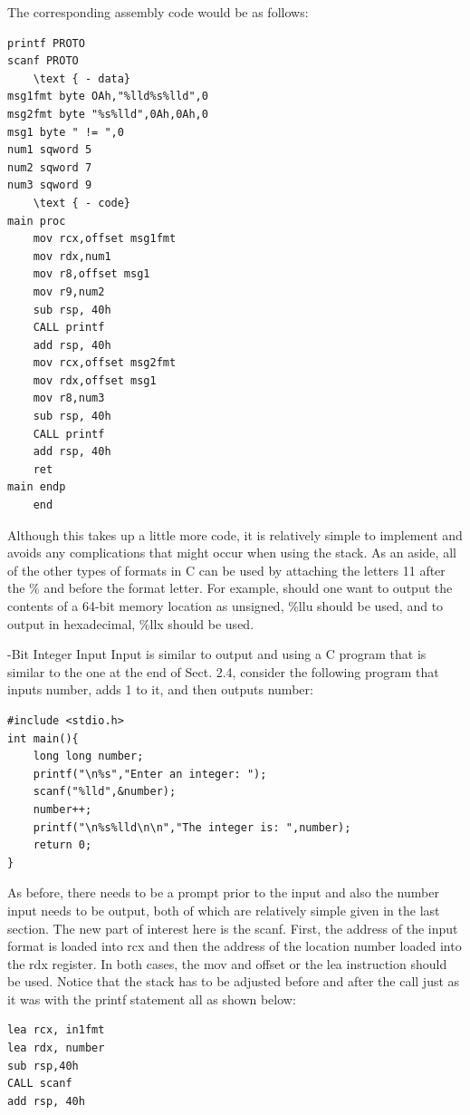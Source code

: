 \documentclass[10pt]{book}
\begin{document}
The corresponding assembly code would be as follows:

\begin{verbatim}
printf PROTO
scanf PROTO
    \text { - data}
msg1fmt byte OAh,"%lld%s%lld",0
msg2fmt byte "%s%lld",0Ah,0Ah,0
msg1 byte " != ",0
num1 sqword 5
num2 sqword 7
num3 sqword 9
    \text { - code}
main proc
    mov rcx,offset msg1fmt
    mov rdx,num1
    mov r8,offset msg1
    mov r9,num2
    sub rsp, 40h
    CALL printf
    add rsp, 40h
    mov rcx,offset msg2fmt
    mov rdx,offset msg1
    mov r8,num3
    sub rsp, 40h
    CALL printf
    add rsp, 40h
    ret
main endp
    end
\end{verbatim}

Although this takes up a little more code, it is relatively simple to implement and avoids any complications that might occur when using the stack. As an aside, all of the other types of formats in C can be used by attaching the letters 11 after the \% and before the format letter. For example, should one want to output the contents of a 64-bit memory location as unsigned, \%llu should be used, and to output in hexadecimal, \%llx should be used.

-Bit Integer Input
Input is similar to output and using a C program that is similar to the one at the end of Sect. 2.4, consider the following program that inputs number, adds 1 to it, and then outputs number:

\begin{verbatim}
#include <stdio.h>
int main(){
    long long number;
    printf("\n%s","Enter an integer: ");
    scanf("%lld",&number);
    number++;
    printf("\n%s%lld\n\n","The integer is: ",number);
    return 0;
}
\end{verbatim}

As before, there needs to be a prompt prior to the input and also the number input needs to be output, both of which are relatively simple given in the last section. The new part of interest here is the scanf. First, the address of the input format is loaded into rcx and then the address of the location number loaded into the rdx register. In both cases, the mov and offset or the lea instruction should be used. Notice that the stack has to be adjusted before and after the call just as it was with the printf statement all as shown below:


\begin{verbatim}
lea rcx, in1fmt
lea rdx, number
sub rsp,40h
CALL scanf
add rsp, 40h
\end{verbatim}
\end{document}
